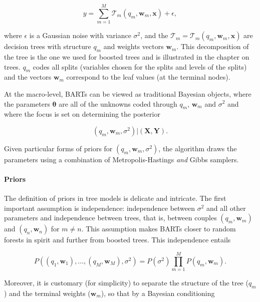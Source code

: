 \begin{equation}
\label{eq:BART}
y = \sum_{m=1}^M\mathcal{T}_m(q_m,\textbf{w}_m, \textbf{x}) + \epsilon,
\end{equation}

where $\epsilon$ is a Gaussian noise with variance $\sigma^2$, and the $\mathcal{T}_m=\mathcal{T}_m(q_m,\textbf{w}_m, \textbf{x})$ are decision trees with structure $q_m$ and weights vectors $\textbf{w}_m$. This decomposition of the tree is the one we used for boosted trees and is illustrated in the chapter on trees. $q_m$ codes all splits (variables chosen for the splits and levels of the splits) and the vectors $\textbf{w}_m$ correspond to the leaf values (at the terminal nodes).

At the macro-level, BARTs can be viewed as traditional Bayesian objects, where the parameters $\boldsymbol{\theta}$ are all of the unknowns coded through $q_m$, $\textbf{w}_m$ and $\sigma^2$ and where the focus is set on determining the posterior

\begin{equation}
\label{eq:bartpost}
\left(q_m,\textbf{w}_m,\sigma^2\right) | (\textbf{X}, \textbf{Y}).
\end{equation}

Given particular forms of priors for $\left(q_m,\textbf{w}_m,\sigma^2\right)$, the algorithm draws the parameters using a combination of Metropolis-Hastings \textit{and} Gibbs samplers.

\paragraph{Priors}

The definition of priors in tree models is delicate and intricate. The first important assumption is independence: independence between $\sigma^2$ and all other parameters and independence between trees, that is, between couples $(q_m,\textbf{w}_m)$ and $(q_n,\textbf{w}_n)$ for $m\neq n$. This assumption makes BARTs closer to random forests in spirit and further from boosted trees. This independence entails

\begin{equation}
P(\left(q_1,\textbf{w}_1\right),\dots,\left(q_M,\textbf{w}_M\right),\sigma^2)=P(\sigma^2)\prod_{m=1}^MP\left(q_m,\textbf{w}_m\right).
\end{equation}

Moreover, it is customary (for simplicity) to separate the structure of the tree ($q_m$) and the terminal weights ($\textbf{w}_m$), so that by a Bayesian conditioning

